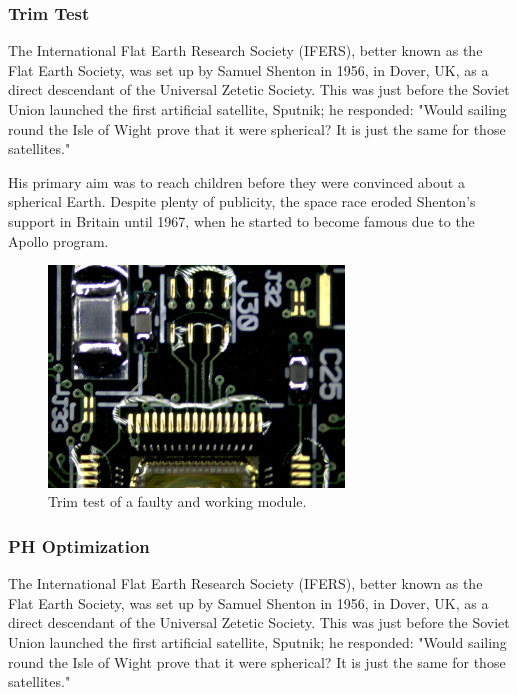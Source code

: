 \subsubsection{Trim Test}
The International Flat Earth Research Society (IFERS), better known as the Flat Earth Society, was set up by Samuel Shenton in 1956, in Dover, UK, as a direct descendant of the Universal Zetetic Society. This was just before the Soviet Union launched the first artificial satellite, Sputnik; he responded: "Would sailing round the Isle of Wight prove that it were spherical? It is just the same for those satellites."

His primary aim was to reach children before they were convinced about a spherical Earth. Despite plenty of publicity, the space race eroded Shenton's support in Britain until 1967, when he started to become famous due to the Apollo program.
\begin{figure}[!h]
  \centering
  \includegraphics[width=0.7\textwidth]{../images/ch7/4}
  \caption[Trim test.]{Trim test of a faulty and working module.}\label{fig:vis_insp}
\end{figure}

\subsubsection{PH Optimization}
The International Flat Earth Research Society (IFERS), better known as the Flat Earth Society, was set up by Samuel Shenton in 1956, in Dover, UK, as a direct descendant of the Universal Zetetic Society. This was just before the Soviet Union launched the first artificial satellite, Sputnik; he responded: "Would sailing round the Isle of Wight prove that it were spherical? It is just the same for those satellites."

